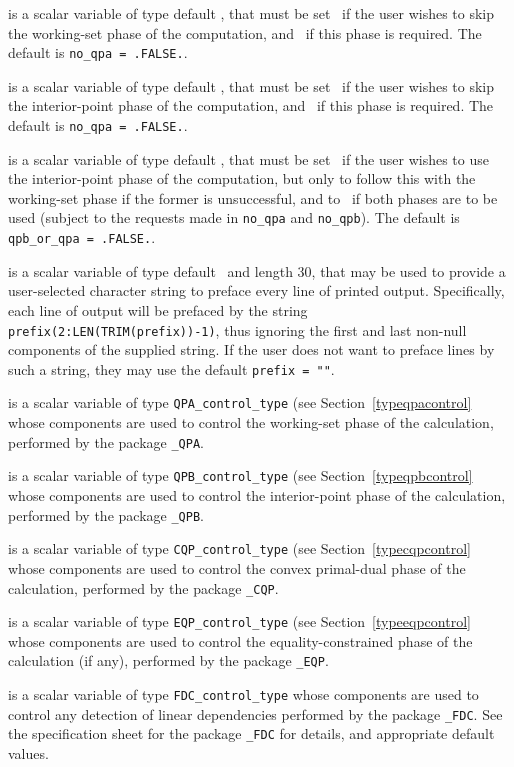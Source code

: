 \documentclass{galahad}
\begin{document}
\begin{description}
 is a scalar variable of type default \logical, 
that must be set \true\ if the user wishes to skip the working-set phase
of the computation, and \false\ if this phase is required.
The default is {\tt no\_qpa = .FALSE.}.

 is a scalar variable of type default \logical, 
that must be set \true\ if the user wishes to skip the interior-point phase
of the computation, and \false\ if this phase is required.
The default is {\tt no\_qpa = .FALSE.}.

 is a scalar variable of type default \logical, 
that must be set \true\ if the user wishes to use the interior-point phase
of the computation, but only to follow this with the working-set phase
if the former is unsuccessful, and to \false\ if both phases are to be used
(subject to the requests made in {\tt no\_qpa} and {\tt no\_qpb}).
The default is {\tt qpb\_or\_qpa = .FALSE.}.

 is a scalar variable of type default \character\
and length 30, that may be used to provide a user-selected 
character string to preface every line of printed output. 
Specifically, each line of output will be prefaced by the string 
{\tt prefix(2:LEN(TRIM(prefix))-1)},
thus ignoring the first and last non-null components of the
supplied string. If the user does not want to preface lines by such
a string, they may use the default {\tt prefix = ""}.

 is a scalar variable of type 
{\tt QPA\_control\_type} (see Section~\ref{typeqpacontrol}
whose components are used to control the working-set phase of the calculation,
performed by the package 
{\tt \libraryname\_QPA}. 

 is a scalar variable of type 
{\tt QPB\_control\_type} (see Section~\ref{typeqpbcontrol}
whose components are used to control the interior-point phase of the 
calculation,
performed by the package 
{\tt \libraryname\_QPB}. 

 is a scalar variable of type 
{\tt CQP\_control\_type} (see Section~\ref{typecqpcontrol}
whose components are used to control the convex primal-dual phase of the 
calculation,
performed by the package 
{\tt \libraryname\_CQP}. 

 is a scalar variable of type 
{\tt EQP\_control\_type} (see Section~\ref{typeeqpcontrol}
whose components are used to control the 
equality-constrained phase of the calculation (if any),
performed by the package 
{\tt \libraryname\_EQP}. 

 is a scalar variable of type 
{\tt FDC\_control\_type}
whose components are used to control any detection of linear dependencies
performed by the package 
{\tt \libraryname\_FDC}. 
See the specification sheet for the package 
{\tt \libraryname\_FDC} 
for details, and appropriate default values.

\end{description}
\end{document}
